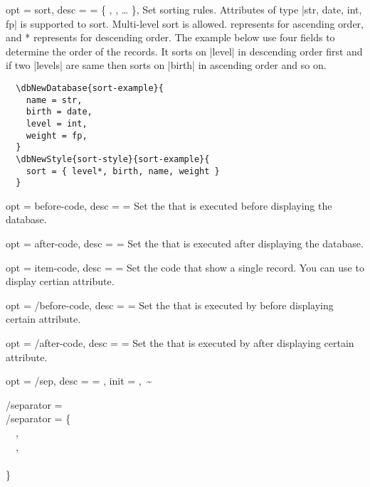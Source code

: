 \documentclass[full]{l3doc}
\begin{document}
\begin{documentation}
\begin{option}{
  opt = sort,
  desc = {= \{ , , \ldots{} \}},
}
  Set sorting rules. Attributes of type |str, date, int, fp| is supported to
  sort.  Multi-level sort is allowed.  represents for ascending
  order, and * represents for descending order. The example below
  use four fields to determine the order of the records. It sorts on |level|
  in descending order first and if two |levels| are same then sorts on |birth|
  in ascending order and so on.
\end{option}

\begin{verbatim}
  \dbNewDatabase{sort-example}{
    name = str,
    birth = date,
    level = int,
    weight = fp,
  }
  \dbNewStyle{sort-style}{sort-example}{
    sort = { level*, birth, name, weight }
  }
\end{verbatim}

\begin{option}{
  opt = before-code,
  desc = {= }
}
  Set the  that is executed before displaying the database.
\end{option}

\begin{option}{
  opt = after-code,
  desc = {= }
}
  Set the  that is executed after displaying the database.
\end{option}

\begin{option}{
  opt = item-code,
  desc = {= }
}
  Set the code that show a single record. You can use  to display
  certian attribute.
\end{option}

\begin{option}{
  opt = {/before-code},
  desc = {= }
}
  Set the  that is executed by  before displaying
  certain attribute.
\end{option}

\begin{option}{
  opt = {/after-code},
  desc = {= }
}
  Set the  that is executed by  after displaying
  certain attribute.
\end{option}

\begin{option}{
  opt = {/sep},
  desc = {= },
  init = {,~\~}
}
\begin{Syntax}
  /separator =  \\
  /separator = \{ \\
  ~~, \\
  ~~, \\
  ~~ \\
  \}
\end{Syntax}


\end{option}
\end{documentation}
\end{document}
